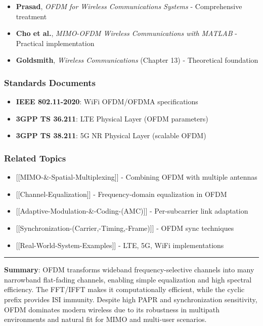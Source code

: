 \begin{itemize}
\tightlist
\item
  \textbf{Prasad}, \emph{OFDM for Wireless Communications Systems} -
  Comprehensive treatment
\item
  \textbf{Cho et al.}, \emph{MIMO-OFDM Wireless Communications with
  MATLAB} - Practical implementation
\item
  \textbf{Goldsmith}, \emph{Wireless Communications} (Chapter 13) -
  Theoretical foundation
\end{itemize}

\subsubsection{Standards Documents}\label{standards-documents}

\begin{itemize}
\tightlist
\item
  \textbf{IEEE 802.11-2020}: WiFi OFDM/OFDMA specifications
\item
  \textbf{3GPP TS 36.211}: LTE Physical Layer (OFDM parameters)
\item
  \textbf{3GPP TS 38.211}: 5G NR Physical Layer (scalable OFDM)
\end{itemize}

\subsubsection{Related Topics}\label{related-topics}

\begin{itemize}
\tightlist
\item
  {[}{[}MIMO-\&-Spatial-Multiplexing{]}{]} - Combining OFDM with
  multiple antennas
\item
  {[}{[}Channel-Equalization{]}{]} - Frequency-domain equalization in
  OFDM
\item
  {[}{[}Adaptive-Modulation-\&-Coding-(AMC){]}{]} - Per-subcarrier link
  adaptation
\item
  {[}{[}Synchronization-(Carrier,-Timing,-Frame){]}{]} - OFDM sync
  techniques
\item
  {[}{[}Real-World-System-Examples{]}{]} - LTE, 5G, WiFi implementations
\end{itemize}

\begin{center}\rule{0.5\linewidth}{0.5pt}\end{center}

\textbf{Summary}: OFDM transforms wideband frequency-selective channels
into many narrowband flat-fading channels, enabling simple equalization
and high spectral efficiency. The FFT/IFFT makes it computationally
efficient, while the cyclic prefix provides ISI immunity. Despite high
PAPR and synchronization sensitivity, OFDM dominates modern wireless due
to its robustness in multipath environments and natural fit for MIMO and
multi-user scenarios.
